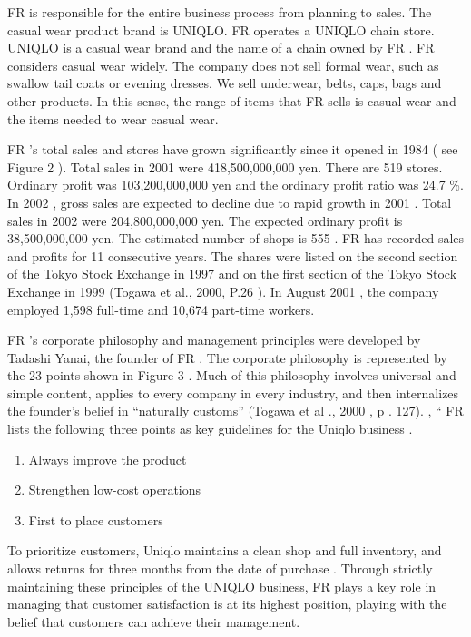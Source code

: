 \documentclass[12pt,]{article}
\providecommand{\tightlist}{%
  \setlength{\itemsep}{0pt}\setlength{\parskip}{0pt}}
\begin{document}
FR is responsible for the entire business process from planning to
sales. The casual wear product brand is UNIQLO. FR operates a UNIQLO
chain store. UNIQLO is a casual wear brand and the name of a chain owned
by FR . FR considers casual wear widely. The company does not sell
formal wear, such as swallow tail coats or evening dresses. We sell
underwear, belts, caps, bags and other products. In this sense, the
range of items that FR sells is casual wear and the items needed to wear
casual wear.

FR 's total sales and stores have grown significantly since it opened in
1984 ( see Figure 2 ). Total sales in 2001 were 418,500,000,000 yen.
There are 519 stores. Ordinary profit was 103,200,000,000 yen and the
ordinary profit ratio was 24.7 \%. In 2002 , gross sales are expected to
decline due to rapid growth in 2001 . Total sales in 2002 were
204,800,000,000 yen. The expected ordinary profit is 38,500,000,000 yen.
The estimated number of shops is 555 . FR has recorded sales and profits
for 11 consecutive years. The shares were listed on the second section
of the Tokyo Stock Exchange in 1997 and on the first section of the
Tokyo Stock Exchange in 1999 (Togawa et al., 2000, P.26 ). In August
2001 , the company employed 1,598 full-time and 10,674 part-time
workers.

FR 's corporate philosophy and management principles were developed by
Tadashi Yanai, the founder of FR . The corporate philosophy is
represented by the 23 points shown in Figure 3 . Much of this philosophy
involves universal and simple content, applies to every company in every
industry, and then internalizes the founder's belief in ``naturally
customs'' (Togawa et al ., 2000 , p . 127). , `` FR lists the following
three points as key guidelines for the Uniqlo business .

\begin{enumerate}
\def\labelenumi{(\arabic{enumi})}
\tightlist
\item
  Always improve the product
\item
  Strengthen low-cost operations
\item
  First to place customers
\end{enumerate}

To prioritize customers, Uniqlo maintains a clean shop and full
inventory, and allows returns for three months from the date of purchase
. Through strictly maintaining these principles of the UNIQLO business,
FR plays a key role in managing that customer satisfaction is at its
highest position, playing with the belief that customers can achieve
their management.
\end{document}
